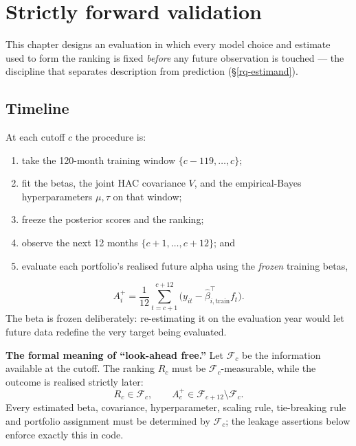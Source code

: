 \hypertarget{forward}{}
\hypertarget{strictly-forward-validation}{%
\chapter{Strictly forward
validation}\label{strictly-forward-validation}}

This chapter designs an evaluation in which every model choice and estimate
used to form the ranking is fixed \emph{before} any future observation is
touched --- the discipline that separates description from prediction
(\S\ref{rq-estimand}).

\hypertarget{timeline}{%
\section{Timeline}\label{timeline}}

At each cutoff $c$ the procedure is:
\begin{enumerate}
\tightlist
\item
  take the 120-month training window $\{c-119,\dots,c\}$;
\item
  fit the betas, the joint HAC covariance $V$, and the empirical-Bayes
  hyperparameters $\mu,\tau$ on that window;
\item
  freeze the posterior scores and the ranking;
\item
  observe the next 12 months $\{c+1,\dots,c+12\}$; and
\item
  evaluate each portfolio's realised future alpha using the \emph{frozen}
  training betas,
\end{enumerate}
\begin{equation}\label{eq:ch11-fwdalpha}
A_i^{+} = \frac{1}{12}\sum_{t=c+1}^{c+12}\bigl(y_{it}-\hat\beta_{i,\text{train}}^{\top} f_t\bigr).
\end{equation}
The beta is frozen deliberately: re-estimating it on the evaluation year
would let future data redefine the very target being evaluated.

\textbf{The formal meaning of ``look-ahead free.''} Let $\mathcal{F}_c$ be
the information available at the cutoff. The ranking $R_c$ must be
$\mathcal{F}_c$-measurable, while the outcome is realised strictly later:
\begin{equation}\label{eq:ch11-measurable}
R_c \in \mathcal{F}_c,
\qquad
A_c^{+} \in \mathcal{F}_{c+12}\setminus\mathcal{F}_c .
\end{equation}
Every estimated beta, covariance, hyperparameter, scaling rule,
tie-breaking rule and portfolio assignment must be determined by
$\mathcal{F}_c$; the leakage assertions below enforce exactly this in code.

